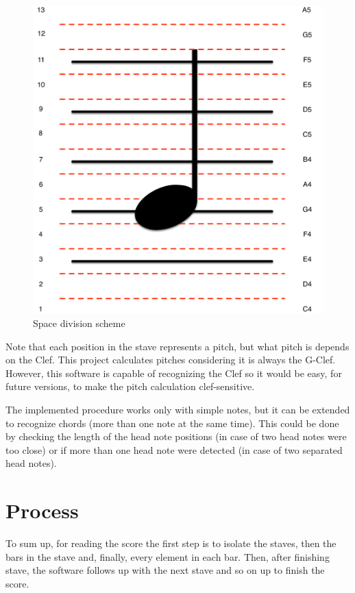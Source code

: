 \documentclass[10pt, a4paper]{article}
\begin{document}
\begin{figure}[h!]
  \centering
    \includegraphics[scale=0.4]{./img/pitch_spaces.png}
  \caption{Space division scheme}
  \label{fig_pitch}
\end{figure}

Note that each position in the stave represents a pitch, but what pitch is depends on the Clef. This project calculates pitches considering it is always the G-Clef. However, this software is capable of recognizing the Clef so it would be easy,  for future versions, to make the pitch calculation clef-sensitive.

The implemented procedure works only with simple notes, but it can be extended to recognize chords (more than one note at the same time). This could be done by checking the length of the head note positions (in case of two head notes were too close) or if more than one head note were detected (in case of two separated head notes).

\section{Process}

To sum up, for reading the score the first step is to isolate the staves, then the bars in the stave and, finally, every element in each bar. Then, after finishing  stave, the software follows up with the next stave and so on up to finish the score. 
\end{document}

